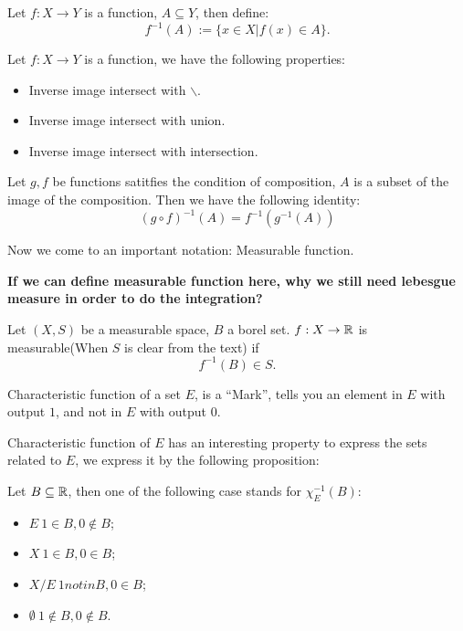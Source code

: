 \documentclass[11pt]{article}
\begin{document}
\begin{definition}
Let \(f:X \to Y\) is a function, \(A\subseteq Y\), then define:
\[
f^{-1}(A) := \{x \in X \vert f(x) \in A\}.
\]
\end{definition}

\begin{proposition}
Let \(f:X \to Y\) is a function, we have the following properties:
\begin{itemize}
\item Inverse image intersect with $\backslash$.
\item Inverse image intersect with union.
\item Inverse image intersect with intersection.
\end{itemize}
\end{proposition}

\begin{proposition}
Let \(g,f\) be functions satitfies the condition of composition, \(A\) is a subset of the image of the composition. Then we have the following identity:
\[
(g \circ f)^{-1}(A) = f^{-1}(g^{-1}(A))
\]
\end{proposition}

Now we come to an important notation: Measurable function.

\textbf{If we can define measurable function here, why we still need lebesgue measure in order to do the integration?}

\begin{definition}
Let \((X,S)\) be a measurable space, \(B\) a borel set. \(f:X \to \mathbb{R}\) is measurable(When \(S\) is clear from the text) if
\[
f^{-1} (B) \in S.
\]
\end{definition}

\begin{definition}
Characteristic function of a set \(E\), is a ``Mark'', tells you an element in \(E\) with output \(1\), and not in \(E\) with output \(0\).
\end{definition}

Characteristic function of \(E\) has an interesting property to express the sets related to \(E\), we express it by the following proposition:

\begin{proposition}
Let \(B\subseteq \mathbb{R}\), then one of the following case stands for \(\chi_E^{-1} (B)\):
\begin{itemize}
\item \(E \ 1 \in B, 0 \notin B\);
\item \(X \ 1 \in B, 0 \in B\);
\item \(X / E \ 1 notin B, 0 \in B\);
\item \(\emptyset \ 1 \notin B, 0 \notin B\).
\end{itemize}
\end{proposition}
\end{document}

